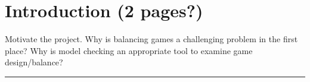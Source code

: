 \chapter{Introduction (2 pages?)}


Motivate the project. Why is balancing games a challenging problem in the first place? Why is model checking an appropriate tool to examine game design/balance?

\hrule

\Blindtext

\Blindtext